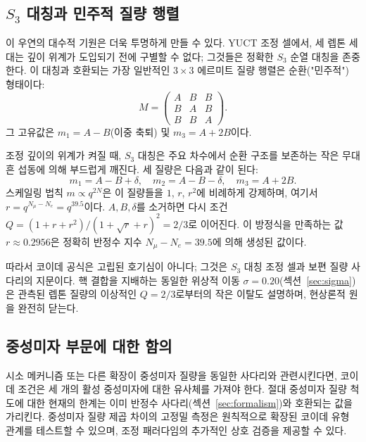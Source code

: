 \documentclass[11pt,a4paper]{article}
\begin{document}
	\subsection{\(S_3\) 대칭과 민주적 질량 행렬}
	
	이 우연의 대수적 기원은 더욱 투명하게 만들 수 있다. YUCT 조정 셀에서, 세 렙톤 세대는 깊이 위계가 도입되기 전에 구별할 수 없다; 그것들은 정확한 \(S_3\) 순열 대칭을 존중한다. 이 대칭과 호환되는 가장 일반적인 \(3\times3\) 에르미트 질량 행렬은 순환("민주적") 형태이다:
	\begin{equation}
		M = \begin{pmatrix}
			A & B & B \\
			B & A & B \\
			B & B & A
		\end{pmatrix}.
		\label{eq:democratic}
	\end{equation}
	그 고유값은 \(m_1 = A - B\)(이중 축퇴) 및 \(m_3 = A + 2B\)이다.
	
	조정 깊이의 위계가 켜질 때, \(S_3\) 대칭은 주요 차수에서 순환 구조를 보존하는 작은 무대흔 섭동에 의해 부드럽게 깨진다. 세 질량은 다음과 같이 된다:
	\begin{equation}
		m_1 = A - B + \delta,\quad
		m_2 = A - B - \delta,\quad
		m_3 = A + 2B.
	\end{equation}
	스케일링 법칙 \(m \propto q^{2N}\)은 이 질량들을 \(1\), \(r\), \(r^2\)에 비례하게 강제하며, 여기서 \(r = q^{N_\mu - N_e} = q^{39.5}\)이다. \(A,B,\delta\)를 소거하면 다시 조건 \(Q = (1+r+r^2)/(1+\sqrt{r}+r)^2 = 2/3\)로 이어진다. 이 방정식을 만족하는 값 \(r \approx 0.2956\)은 정확히 반정수 지수 \(N_\mu - N_e = 39.5\)에 의해 생성된 값이다.
	
	따라서 코이데 공식은 고립된 호기심이 아니다; 그것은 \(S_3\) 대칭 조정 셀과 보편 질량 사다리의 지문이다. 핵 결합을 지배하는 동일한 위상적 이동 \(\sigma = 0.20\)(섹션~\ref{sec:sigma})은 관측된 렙톤 질량의 이상적인 \(Q = 2/3\)로부터의 작은 이탈도 설명하며, 현상론적 원을 완전히 닫는다.
	
	\subsection{중성미자 부문에 대한 함의}
	
	시소 메커니즘 또는 다른 확장이 중성미자 질량을 동일한 사다리와 관련시킨다면, 코이데 조건은 세 개의 활성 중성미자에 대한 유사체를 가져야 한다. 절대 중성미자 질량 척도에 대한 현재의 한계는 이미 반정수 사다리(섹션~\ref{sec:formalism})와 호환되는 값을 가리킨다. 중성미자 질량 제곱 차이의 고정밀 측정은 원칙적으로 확장된 코이데 유형 관계를 테스트할 수 있으며, 조정 패러다임의 추가적인 상호 검증을 제공할 수 있다.
	
\end{document}

